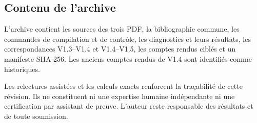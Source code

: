 \documentclass[11pt,a4paper]{article}
\begin{document}
\subsection*{Contenu de l'archive}
L'archive contient les sources des trois PDF, la bibliographie commune,
les commandes de compilation et de contrôle, les diagnostics et leurs
résultats, les correspondances V1.3--V1.4 et V1.4--V1.5, les comptes
rendus ciblés et un manifeste SHA-256. Les anciens comptes rendus
de V1.4 sont identifiés comme historiques.

Les relectures assistées et les calculs exacts renforcent la traçabilité
de cette révision. Ils ne constituent ni une expertise humaine
indépendante ni une certification par assistant de preuve.
L'auteur reste responsable des résultats et de toute soumission.
\end{document}
